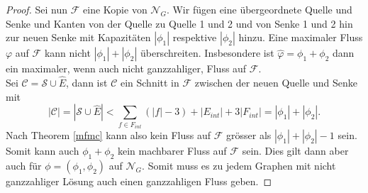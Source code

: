 \begin{proof}
Sei nun $\mathcal{F}$ eine Kopie von $\mathcal{N}_G$. Wir fügen eine übergeordnete Quelle und Senke und Kanten von der Quelle zu Quelle 1 und 2 und von Senke 1 und 2 hin zur neuen Senke mit Kapazitäten $|\phi_1|$ respektive $|\phi_2|$ hinzu. Eine maximaler Fluss $\varphi$ auf $\mathcal{F}$ kann nicht $|\phi_1| + |\phi_2|$ überschreiten. Insbesondere ist $ \hat{\varphi} = \phi_1 + \phi_2 $ dann ein maximaler, wenn auch nicht ganzzahliger, Fluss auf $\mathcal{F}$.\\

Sei $\mathcal{C} = \mathcal{S} \cup \hat{E}$, dann ist $\mathcal{C}$ ein Schnitt in $\mathcal{F}$ zwischen der neuen Quelle und Senke mit $$|\mathcal{C}| = |\mathcal{S} \cup \hat{E}| < \sum_{f \in F_{int}}{(|f|-3)} +  |E_{int}| + 3|F_{int}|  = |\phi_1| + |\phi_2|.$$ 
Nach Theorem \ref{mfmc} kann also kein Fluss auf $\mathcal{F}$ grösser als $|\phi_1| + |\phi_2| - 1$ sein. Somit kann auch $\phi_1 + \phi_2$ kein machbarer Fluss auf $\mathcal{F}$ sein. Dies gilt dann aber auch für $\phi = (\phi_1,\phi_2)$ auf $\mathcal{N}_G.$ Somit muss es zu jedem Graphen mit nicht ganzzahliger Lösung auch einen ganzzahligen Fluss geben.

\end{proof}